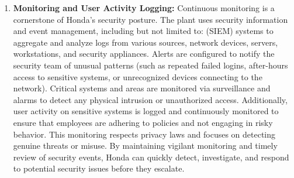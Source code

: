 \begin{enumerate}
    \item \textbf{Monitoring and User Activity Logging:} Continuous monitoring is a cornerstone of Honda’s security posture. The plant uses security information and event management, including but not limited to: (SIEM) systems to aggregate and analyze logs from various sources, network devices, servers, workstations, and security appliances. Alerts are configured to notify the security team of unusual patterns (such as repeated failed logins, after-hours access to sensitive systems, or unrecognized devices connecting to the network). Critical systems and areas are monitored via surveillance and alarms to detect any physical intrusion or unauthorized access. Additionally, user activity on sensitive systems is logged and continuously monitored to ensure that employees are adhering to policies and not engaging in risky behavior. This monitoring respects privacy laws and focuses on detecting genuine threats or misuse. By maintaining vigilant monitoring and timely review of security events, Honda can quickly detect, investigate, and respond to potential security issues before they escalate.
\end{enumerate}

